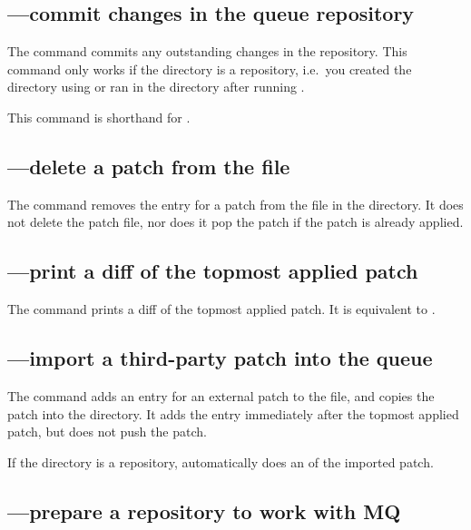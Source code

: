 \subsection{---commit changes in the queue repository}

The  command commits any outstanding changes in the
 repository.  This command only works if the
 directory is a repository, i.e.~you created the
directory using  or ran
 in the directory after running .

This command is shorthand for .

\subsection{---delete a patch from the
   file}

The  command removes the entry for a patch from the
 file in the  directory.  It
does not delete the patch file, nor does it pop the patch if the patch
is already applied.

\subsection{---print a diff of the topmost applied patch}

The  command prints a diff of the topmost applied patch.
It is equivalent to .

\subsection{---import a third-party patch into the queue}

The  command adds an entry for an external patch to the
 file, and copies the patch into the
 directory.  It adds the entry immediately after
the topmost applied patch, but does not push the patch.

If the  directory is a repository,
 automatically does an  of the imported
patch.

\subsection{---prepare a repository to work with MQ}

